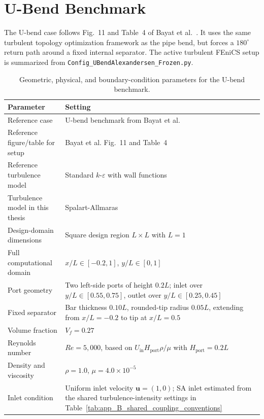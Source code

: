 \FloatBarrier

\section{U-Bend Benchmark}
\label{sec:app_B_config_alexandersen_ubend}

The U-bend case follows Fig.~11 and Table~4 of Bayat et al.~\cite{Bayat2026}. It uses the same turbulent topology optimization framework as the pipe bend, but forces a $180^\circ$ return path around a fixed internal separator. The active turbulent FEniCS setup is summarized from \texttt{Config\_UBendAlexandersen\_Frozen.py}.

\begin{table}[htbp]
	\centering
	\footnotesize
	\caption{Geometric, physical, and boundary-condition parameters for the U-bend benchmark.}
	\label{tab:app_B_alexandersen_ubend_physical}
	\renewcommand{\arraystretch}{1.2}
	\begin{tabularx}{\textwidth}{l X}
		\hline
		\textbf{Parameter} & \textbf{Setting} \\
		\hline
		Reference case & U-bend benchmark from Bayat et al.~\cite{Bayat2026} \\
		Reference figure/table for setup & Bayat et al. Fig.~11 and Table~4 \\
		Reference turbulence model & Standard $k$-$\varepsilon$ with wall functions \\
		Turbulence model in this thesis & Spalart-Allmaras \\
		Design-domain dimensions & Square design region $L\times L$ with $L=1$ \\
		Full computational domain & $x/L\in[-0.2,1]$, $y/L\in[0,1]$ \\
		Port geometry & Two left-side ports of height $0.2L$; inlet over $y/L\in[0.55,0.75]$, outlet over $y/L\in[0.25,0.45]$ \\
		Fixed separator & Bar thickness $0.10L$, rounded-tip radius $0.05L$, extending from $x/L=-0.2$ to tip at $x/L=0.5$ \\
		Volume fraction & $V_f=0.27$ \\
		Reynolds number & $Re=5{,}000$, based on $U_{\mathrm{in}}H_{\mathrm{port}}\rho/\mu$ with $H_{\mathrm{port}}=0.2L$ \\
		Density and viscosity & $\rho=1.0$, $\mu=4.0\times10^{-5}$ \\
		Inlet condition & Uniform inlet velocity $\mathbf{u}=(1,0)$; SA inlet estimated from the shared turbulence-intensity settings in Table~\ref{tab:app_B_shared_coupling_conventions} \\

\end{tabularx}
\end{table}
